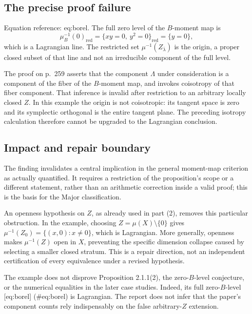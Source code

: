 \documentclass[10pt]{article}
\begin{document}
\subsection*{The precise proof failure}
Equation reference: eq:borel. The full zero level of the \(B\)-moment map is \[\mu_B^{-1}(0)_{\mathrm{red}}
 =\{xy=0,\ y^2=0\}_{\mathrm{red}}
 =\{y=0\},
 \] which is a Lagrangian line. The restricted set \(\mu^{-1}(Z_{\bar\lambda})\) is the origin, a proper closed subset of that line and not an irreducible component of the full level.\par
The proof on p. 259 asserts that the component \(\Lambda\) under consideration is a component of the fiber of the \(B\)-moment map, and invokes coisotropy of that fiber component. That inference is invalid after restriction to an arbitrary locally closed \(Z\). In this example the origin is not coisotropic: its tangent space is zero and its symplectic orthogonal is the entire tangent plane. The preceding isotropy calculation therefore cannot be upgraded to the Lagrangian conclusion.\par
\subsection*{Impact and repair boundary}
The finding invalidates a central implication in the general moment-map criterion as actually quantified. It requires a restriction of the proposition’s scope or a different statement, rather than an arithmetic correction inside a valid proof; this is the basis for the Major classification.\par
An openness hypothesis on \(Z\), as already used in part (2), removes this particular obstruction. In the example, choosing \(Z=\mu(X)\setminus\{0\}\) gives \(\mu^{-1}(Z_0)=\{(x,0):x\ne0\}\), which is Lagrangian. More generally, openness makes \(\mu^{-1}(Z)\) open in \(X\), preventing the specific dimension collapse caused by selecting a smaller closed stratum. This is a repair direction, not an independent certification of every equivalence under a revised hypothesis.\par
The example does not disprove Proposition 2.1.1(2), the zero-\(B\)-level conjecture, or the numerical equalities in the later case studies. Indeed, its full zero-\(B\)-level [eq:borel] (\#eq:borel) is Lagrangian. The report does not infer that the paper’s component counts rely indispensably on the false arbitrary-\(Z\) extension.\par
\end{document}
